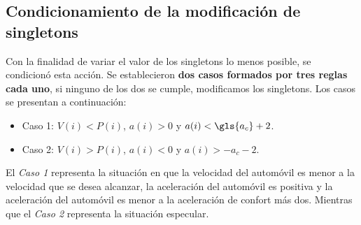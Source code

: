 
\subsection{Condicionamiento de la modificación de singletons}
\label{subsec:condicionamiento}


Con la finalidad de variar el valor de los singletons lo menos posible, se condicionó esta acción. Se establecieron \textbf{dos casos formados por tres reglas cada uno}, si ninguno de los dos se cumple, modificamos los singletons. Los casos se presentan a continuación:



\begin{itemize}
\item Caso 1: $V(i) < P(i)$, $a(i) > 0$ y $a(i) < \gls{a_c}+2$.
\item Caso 2: $V(i) > P(i)$, $a(i) < 0$ y $a(i) > -a_c - 2$.
\end{itemize}

El \textit{Caso 1} representa la situación en que la velocidad del automóvil es menor a la velocidad que se desea alcanzar, la aceleración del automóvil es positiva y la aceleración del automóvil es menor a la aceleración de confort más dos. Mientras que el \textit{Caso 2} representa la situación especular. 

